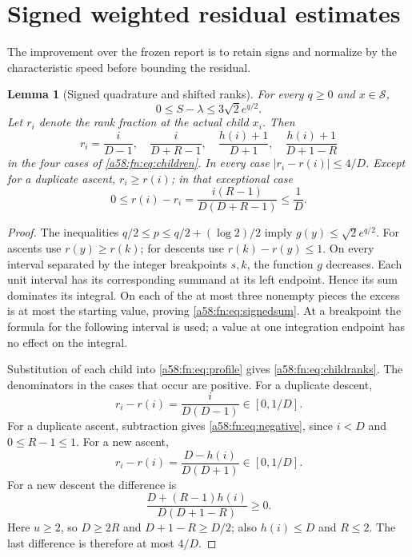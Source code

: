 \documentclass[11pt,letterpaper]{article}
\newtheorem{lemma}[theorem]{Lemma}
\theoremstyle{remark}
\newcommand{\calS}{\mathcal S}
\begin{document}
\section{Signed weighted residual estimates}\label{a58:fn:sec:residual}
The improvement over the frozen report is to retain signs and normalize by the characteristic speed before bounding the residual.

\begin{lemma}[Signed quadrature and shifted ranks]\label{a58:fn:lem:shifts}
For every $q\ge0$ and $x\in\calS$,
\begin{equation}\label{a58:fn:eq:signedsum}
 0\le S-\lambda\le3\sqrt2e^{q/2}.
\end{equation}
Let $r_i$ denote the rank fraction at the actual child $x_i$. Then
\begin{equation}\label{a58:fn:eq:childranks}
 r_i=\frac i{D-1},\quad\frac i{D+R-1},\quad
 \frac{h(i)+1}{D+1},\quad\frac{h(i)+1}{D+1-R}
\end{equation}
in the four cases of \eqref{a58:fn:eq:children}. In every case $|r_i-r(i)|\le4/D$. Except for a duplicate ascent, $r_i\ge r(i)$; in that exceptional case
\begin{equation}\label{a58:fn:eq:negative}
 0\le r(i)-r_i=\frac{i(R-1)}{D(D+R-1)}\le\frac1D.
\end{equation}
\end{lemma}
\begin{proof}
The inequalities $q/2\le p\le q/2+(\log2)/2$ imply $g(y)\le\sqrt2e^{q/2}$. For ascents use $r(y)\ge r(k)$; for descents use $r(k)-r(y)\le1$. On every interval separated by the integer breakpoints $s,k$, the function $g$ decreases. Each unit interval has its corresponding summand at its left endpoint. Hence its sum dominates its integral. On each of the at most three nonempty pieces the excess is at most the starting value, proving \eqref{a58:fn:eq:signedsum}. At a breakpoint the formula for the following interval is used; a value at one integration endpoint has no effect on the integral.

Substitution of each child into \eqref{a58:fn:eq:profile} gives \eqref{a58:fn:eq:childranks}. The denominators in the cases that occur are positive. For a duplicate descent,
\[
 r_i-r(i)=\frac{i}{D(D-1)}\in[0,1/D].
\]
For a duplicate ascent, subtraction gives \eqref{a58:fn:eq:negative}, since $i<D$ and $0\le R-1\le1$. For a new ascent,
\[
 r_i-r(i)=\frac{D-h(i)}{D(D+1)}\in[0,1/D].
\]
For a new descent the difference is
\[
 \frac{D+(R-1)h(i)}{D(D+1-R)}\ge0.
\]
Here $u\ge2$, so $D\ge2R$ and $D+1-R\ge D/2$; also $h(i)\le D$ and $R\le2$. The last difference is therefore at most $4/D$.
\end{proof}
\end{document}
